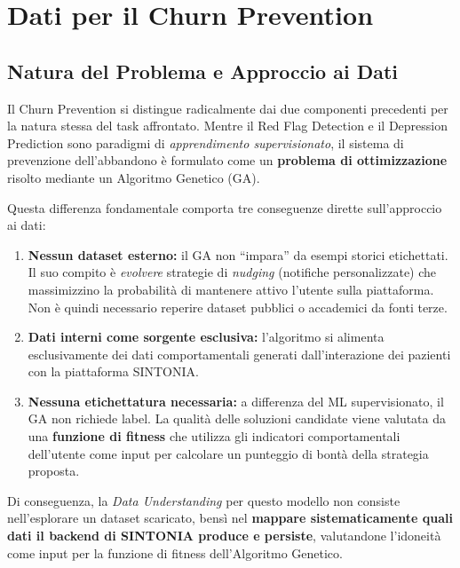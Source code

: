 \clearpage
\section{Dati per il Churn Prevention}
\label{sec:data_churn}

\subsection{Natura del Problema e Approccio ai Dati}
\label{subsec:natura_churn}

Il Churn Prevention si distingue radicalmente dai due componenti precedenti per la natura stessa del task affrontato. Mentre il Red Flag Detection e il Depression Prediction sono paradigmi di \textit{apprendimento supervisionato}, il sistema di prevenzione dell'abbandono è formulato come un \textbf{problema di ottimizzazione} risolto mediante un Algoritmo Genetico (GA).

Questa differenza fondamentale comporta tre conseguenze dirette sull'approccio ai dati:
\begin{enumerate}
    \item \textbf{Nessun dataset esterno:} il GA non ``impara'' da esempi storici etichettati. Il suo compito è \textit{evolvere} strategie di \textit{nudging} (notifiche personalizzate) che massimizzino la probabilità di mantenere attivo l'utente sulla piattaforma. Non è quindi necessario reperire dataset pubblici o accademici da fonti terze.
    \item \textbf{Dati interni come sorgente esclusiva:} l'algoritmo si alimenta esclusivamente dei dati comportamentali generati dall'interazione dei pazienti con la piattaforma SINTONIA.
    \item \textbf{Nessuna etichettatura necessaria:} a differenza del ML supervisionato, il GA non richiede label. La qualità delle soluzioni candidate viene valutata da una \textbf{funzione di fitness} che utilizza gli indicatori comportamentali dell'utente come input per calcolare un punteggio di bontà della strategia proposta.
\end{enumerate}

Di conseguenza, la \textit{Data Understanding} per questo modello non consiste nell'esplorare un dataset scaricato, bensì nel \textbf{mappare sistematicamente quali dati il backend di SINTONIA produce e persiste}, valutandone l'idoneità come input per la funzione di fitness dell'Algoritmo Genetico.

